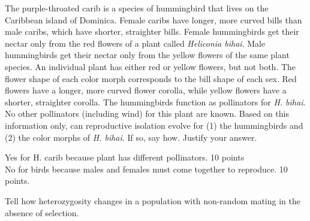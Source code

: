 The purple-throated carib is a species of hummingbird that lives on the Caribbean island of Dominica. Female caribs have longer, more curved bills than male caribs, which have shorter, straighter bills. Female hummingbirds get their nectar only from the red flowers of a plant called \textit{Heliconia bihai}. Male hummingbirds get their nectar only from the yellow flowers of the same plant species. An individual plant has either red or yellow flowers, but not both. The flower shape of each color morph corresponds to the bill shape of each sex. Red flowers have a longer, more curved flower corolla, while yellow flowers have a shorter, straighter corolla. The hummingbirds function as pollinators for \textit{H. bihai}.  No other pollinators (including wind) for this plant are known. Based on this information only, can reproductive isolation evolve for (1) the hummingbirds and (2) the color morphs of \textit{H. bihai}.  If so, say how. Justify your answer. 
	\begin{solution}
	Yes for H. carib because plant has different pollinators. 10 points\\
	No for birds because males and females must come together to reproduce. 10 points.
	\end{solution}


\question[3]
Tell how heterozygosity changes in a population with non-random mating in the absence of selection.



